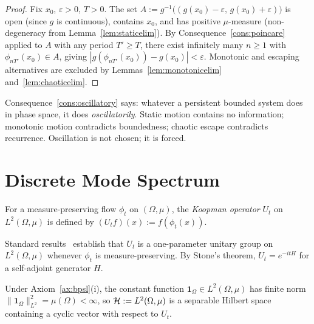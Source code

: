 \begin{proof}
Fix $x_{0}$, $\varepsilon>0$, $T>0$.
The set
$A:=g^{-1}\bigl((g(x_{0})-\varepsilon,\,g(x_{0})+\varepsilon)\bigr)$
is open (since $g$ is continuous), contains $x_{0}$, and has positive
$\mu$-measure (non-degeneracy from Lemma~\ref{lem:staticelim}).
By Consequence~\ref{cons:poincare} applied to $A$ with any period
$T'\ge T$, there exist infinitely many $n\ge 1$ with
$\phi_{nT'}(x_{0})\in A$, giving
$|g(\phi_{nT'}(x_{0}))-g(x_{0})|<\varepsilon$.
Monotonic and escaping alternatives are excluded by
Lemmas~\ref{lem:monotonicelim} and~\ref{lem:chaoticelim}.
\end{proof}

\begin{remark}
Consequence~\ref{cons:oscillatory} says: whatever a persistent bounded
system does in phase space, it does \emph{oscillatorily}.
Static motion contains no information; monotonic motion contradicts
boundedness; chaotic escape contradicts recurrence.
Oscillation is not chosen; it is forced.
\end{remark}

\section{Discrete Mode Spectrum}
\label{sec:ch3-discretemodes}
\label{sec:discretemodes}

\begin{definition}
\label{def:koopman}
For a measure-preserving flow $\phi_{t}$ on $(\Omega,\mu)$, the
\emph{Koopman operator} $U_{t}$ on $L^{2}(\Omega,\mu)$ is defined by
$(U_{t}f)(x):=f(\phi_{t}(x))$.
\end{definition}

Standard results~\citep{koopman1931,reed1980} establish that $U_{t}$ is a
one-parameter unitary group on $L^{2}(\Omega,\mu)$ whenever $\phi_{t}$ is
measure-preserving.
By Stone's theorem, $U_{t}=e^{-itH}$ for a self-adjoint generator $H$.

\begin{lemma}
\label{lem:tracefinite}
Under Axiom~\ref{ax:bpsl}(i), the constant function
$\mathbf{1}_{\Omega}\in L^{2}(\Omega,\mu)$ has finite norm
$\|\mathbf{1}_{\Omega}\|^{2}_{L^{2}}=\mu(\Omega)<\infty$, so
$\mathcal{H}:=L^{2}(\Omega,\mu)$ is a separable Hilbert space containing a
cyclic vector with respect to $U_{t}$.
\end{lemma}

